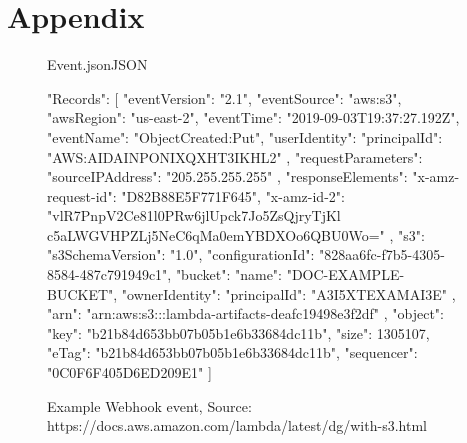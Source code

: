 \chapter{Appendix}

\begin{figure}
\begin{codeblock}{Event.json}{JSON}
\begin{javacode}
	{
		"Records": [
		{
			"eventVersion": "2.1",
			"eventSource": "aws:s3",
			"awsRegion": "us-east-2",
			"eventTime": "2019-09-03T19:37:27.192Z",
			"eventName": "ObjectCreated:Put",
			"userIdentity": {
				"principalId": "AWS:AIDAINPONIXQXHT3IKHL2"
			},
			"requestParameters": {
				"sourceIPAddress": "205.255.255.255"
			},
			"responseElements": {
				"x-amz-request-id": "D82B88E5F771F645",
				"x-amz-id-2": "vlR7PnpV2Ce81l0PRw6jlUpck7Jo5ZsQjryTjKl
					c5aLWGVHPZLj5NeC6qMa0emYBDXOo6QBU0Wo="
			},
			"s3": {
				"s3SchemaVersion": "1.0",
				"configurationId": "828aa6fc-f7b5-4305-8584-487c791949c1",
				"bucket": {
					"name": "DOC-EXAMPLE-BUCKET",
					"ownerIdentity": {
						"principalId": "A3I5XTEXAMAI3E"
					},
					"arn": "arn:aws:s3:::lambda-artifacts-deafc19498e3f2df"
				},
				"object": {
					"key": "b21b84d653bb07b05b1e6b33684dc11b",
					"size": 1305107,
					"eTag": "b21b84d653bb07b05b1e6b33684dc11b",
					"sequencer": "0C0F6F405D6ED209E1"
				}
			}
		}
		]
	}
	\end{javacode}
\end{codeblock}
\caption{Example Webhook event, Source: https://docs.aws.amazon.com/lambda/latest/dg/with-s3.html}
\label{appendix:webhook}
\end{figure}

\pagebreak

